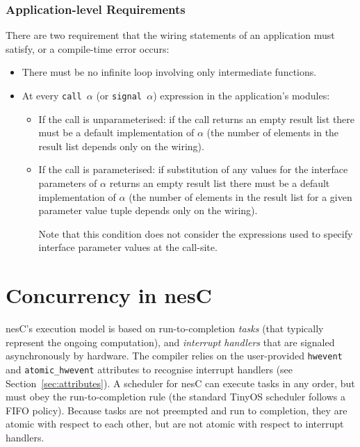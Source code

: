\documentclass[11pt,letterpaper]{article}
\newcommand{\code}[1]{{\tt #1}}
\newcommand{\nesc}{nesC\xspace}
\newcommand{\tinyos}{TinyOS\xspace}
\begin{document}
\subsubsection{Application-level Requirements}
\label{sec:wiring-reqs}

There are two requirement that the wiring statements of an application must
satisfy, or a compile-time error occurs:
\begin{itemize}
\item There must be no infinite loop involving only intermediate functions.
\item At every \code{call $\alpha$} (or \code{signal $\alpha$}) expression
in the application's modules:
\begin{itemize}
\item If the call is unparameterised: if the call returns an empty result
list there must be a default implementation of $\alpha$ (the number of
elements in the result list depends only on the wiring).
\item If the call is parameterised: if substitution of any values for the
interface parameters of $\alpha$ returns an empty result list there must be
a default implementation of $\alpha$ (the number of elements in the result
list for a given parameter value tuple depends only on the wiring).

Note that this condition does not consider the expressions used to specify
interface parameter values at the call-site.
\end{itemize}
\end{itemize}

\section{Concurrency in \nesc}
\label{sec:concurrency}

\nesc's execution model is based on run-to-completion
\emph{tasks} (that typically represent the ongoing computation), and
\emph{interrupt handlers} that are signaled asynchronously by hardware. The
compiler relies on the user-provided \code{hwevent} and
\code{atomic\_hwevent} attributes to recognise interrupt handlers (see
Section~\ref{sec:attributes}).  A scheduler for \nesc can execute tasks in
any order, but must obey the run-to-completion rule (the standard \tinyos
scheduler follows a FIFO policy). Because tasks are not preempted and run
to completion, they are atomic with respect to each other, but are not
atomic with respect to interrupt handlers.
\end{document}
